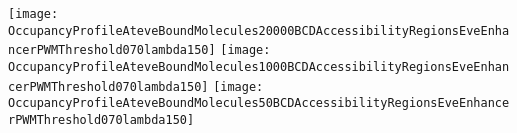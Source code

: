 \documentclass[11pt]{article}
\begin{document}
 

\clearpage

\begin{center}
\texttt{[image: OccupancyProfileAteveBoundMolecules20000BCDAccessibilityRegionsEveEnhancerPWMThreshold070lambda150]}
\texttt{[image: OccupancyProfileAteveBoundMolecules1000BCDAccessibilityRegionsEveEnhancerPWMThreshold070lambda150]}
\texttt{[image: OccupancyProfileAteveBoundMolecules50BCDAccessibilityRegionsEveEnhancerPWMThreshold070lambda150]}
\end{center}
\end{document}
